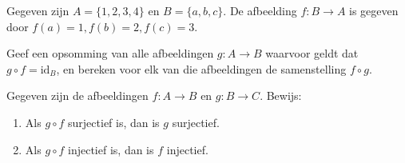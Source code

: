 \begin{exercise}[Optioneel]
Gegeven zijn $A=\{1,2,3,4\}$ en $B=\{a,b,c\}$. De afbeelding $f:B\rightarrow A$ is gegeven door $f(a)=1, f(b)=2, f(c)=3$.

Geef een opsomming van alle afbeeldingen $g:A\rightarrow B$ waarvoor geldt dat $g\circ f=\text{id}_B$, en bereken voor elk van die afbeeldingen de samenstelling $f\circ g$.
\end{exercise}

\begin{exercise}[Optioneel]
Gegeven zijn de afbeeldingen $f:A\rightarrow B$ en $g:B\rightarrow C$. Bewijs:
\begin{enumerate}[label=\alph*.]
    \item Als $g\circ f$ surjectief is, dan is $g$ surjectief.
    \item Als $g\circ f$ injectief is, dan is $f$ injectief.
\end{enumerate}
\end{exercise}
